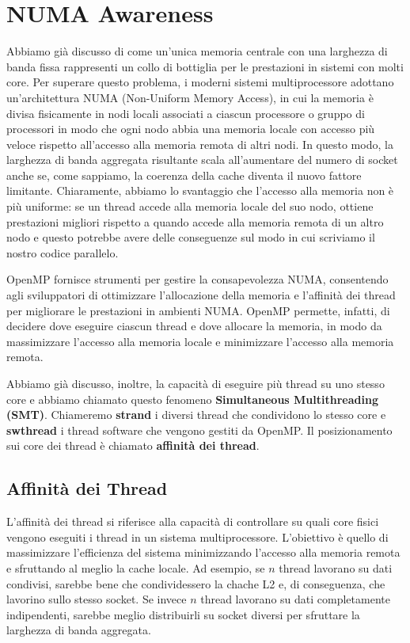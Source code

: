 \section{NUMA Awareness}
Abbiamo già discusso di come un'unica memoria centrale con una larghezza di banda fissa rappresenti un collo di bottiglia per le prestazioni in sistemi con molti core. Per superare questo problema, i moderni sistemi multiprocessore adottano un'architettura NUMA (Non-Uniform Memory Access), in cui la memoria è divisa fisicamente in nodi locali associati a ciascun processore o gruppo di processori in modo che ogni nodo abbia una memoria locale con accesso più veloce rispetto all'accesso alla memoria remota di altri nodi.
In questo modo, la larghezza di banda aggregata risultante scala all'aumentare del numero di socket anche se, come sappiamo, la coerenza della cache diventa il nuovo fattore limitante. Chiaramente, abbiamo lo svantaggio che l'accesso alla memoria non è più uniforme: se un thread accede alla memoria locale del suo nodo, ottiene prestazioni migliori rispetto a quando accede alla memoria remota di un altro nodo e questo potrebbe avere delle conseguenze sul modo in cui scriviamo il nostro codice parallelo.

OpenMP fornisce strumenti per gestire la consapevolezza NUMA, consentendo agli sviluppatori di ottimizzare l'allocazione della memoria e l'affinità dei thread per migliorare le prestazioni in ambienti NUMA. OpenMP permette, infatti, di decidere dove eseguire ciascun thread e dove allocare la memoria, in modo da massimizzare l'accesso alla memoria locale e minimizzare l'accesso alla memoria remota.

Abbiamo già discusso, inoltre, la capacità di eseguire più thread su uno stesso core e abbiamo chiamato questo fenomeno \textbf{Simultaneous Multithreading (SMT)}. Chiameremo \textbf{strand} i diversi thread che condividono lo stesso core e \textbf{swthread} i thread software che vengono gestiti da OpenMP. Il posizionamento sui core dei thread è chiamato \textbf{affinità dei thread}.

\subsection{Affinità dei Thread}
L'affinità dei thread si riferisce alla capacità di controllare su quali core fisici vengono eseguiti i thread in un sistema multiprocessore. L'obiettivo è quello di massimizzare l'efficienza del sistema minimizzando l'accesso alla memoria remota e sfruttando al meglio la cache locale. Ad esempio, se $n$ thread lavorano su dati condivisi, sarebbe bene che condividessero la chache L2 e, di conseguenza, che lavorino sullo stesso socket. Se invece $n$ thread lavorano su dati completamente indipendenti, sarebbe meglio distribuirli su socket diversi per sfruttare la larghezza di banda aggregata.

